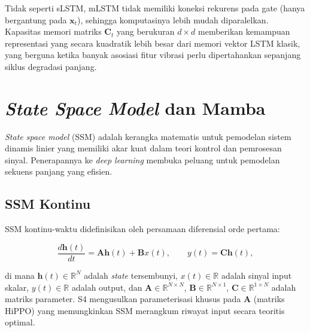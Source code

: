 Tidak seperti sLSTM, mLSTM tidak memiliki koneksi rekurens pada gate
(hanya bergantung pada $\mathbf{x}_t$), sehingga komputasinya lebih mudah
diparalelkan. Kapasitas memori matriks $\mathbf{C}_t$ yang berukuran $d \times d$
memberikan kemampuan representasi yang secara kuadratik lebih besar dari
memori vektor LSTM klasik, yang berguna ketika banyak asosiasi fitur vibrasi
perlu dipertahankan sepanjang siklus degradasi panjang.

\section{\emph{State Space Model} dan Mamba}
\label{sec:bab3_ssm_mamba}

\emph{State space model} (SSM) adalah kerangka matematis untuk pemodelan
sistem dinamis linier yang memiliki akar kuat dalam teori kontrol dan pemrosesan
sinyal. Penerapannya ke \emph{deep learning} membuka peluang untuk pemodelan
sekuens panjang yang efisien.

\subsection{SSM Kontinu}
\label{subsec:bab3_ssm_kontinu}

SSM kontinu-waktu didefinisikan oleh persamaan diferensial orde pertama:

\begin{equation}\label{eq:bab3_ssm_ode}
  \frac{d\mathbf{h}(t)}{dt} = \mathbf{A} \mathbf{h}(t) + \mathbf{B} x(t),
  \qquad y(t) = \mathbf{C} \mathbf{h}(t),
\end{equation}

\noindent di mana $\mathbf{h}(t) \in \mathbb{R}^N$ adalah \emph{state}
tersembunyi, $x(t) \in \mathbb{R}$ adalah sinyal input skalar,
$y(t) \in \mathbb{R}$ adalah output, dan $\mathbf{A} \in \mathbb{R}^{N \times N}$,
$\mathbf{B} \in \mathbb{R}^{N \times 1}$, $\mathbf{C} \in \mathbb{R}^{1 \times N}$
adalah matriks parameter. S4  mengusulkan parameterisasi
khusus pada $\mathbf{A}$ (matriks HiPPO) yang memungkinkan SSM merangkum
riwayat input secara teoritis optimal.

